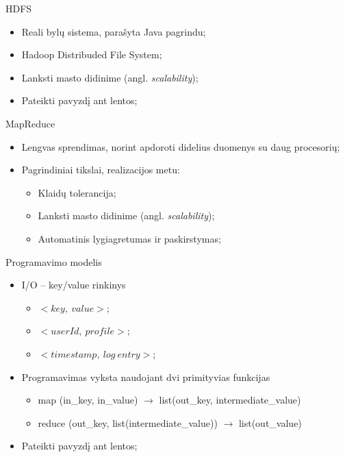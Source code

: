 \documentclass{beamer}
\begin{document}
  \begin{frame}{HDFS}
    \begin{itemize}
      \item Reali bylų sistema, parašyta Java pagrindu;
      \item Hadoop Distribuded File System;
      \item Lanksti masto didinime (angl. \textit{scalability});
      \item Pateikti pavyzdį ant lentos;
    \end{itemize}
  \end{frame}

  \begin{frame}{MapReduce}
    \begin{itemize}
      \item Lengvas sprendimas, norint apdoroti didelius duomenys su daug procesorių;
      \item Pagrindiniai tikslai, realizacijos metu:
      \begin{itemize}
        \item Klaidų tolerancija;
        \item Lanksti masto didinime (angl. \textit{scalability});
        \item Automatinis lygiagretumas ir paskirstymas;
      \end{itemize}
    \end{itemize}
  \end{frame}

  \begin{frame}{Programavimo modelis}
    \begin{itemize}
      \item I/O -- key/value rinkinys
      \begin{itemize}
        \item $<key,~value>$;
        \item $<userId,~profile>$;
        \item $<timestamp,~log~entry>$;
      \end{itemize}
      \item Programavimas vyksta naudojant dvi primityvias funkcijas
      \begin{itemize}
        \item map (in\_key, in\_value) $\rightarrow$ list(out\_key, intermediate\_value)
        \item reduce (out\_key, list(intermediate\_value)) $\rightarrow$ list(out\_value)
      \end{itemize}
      \item Pateikti pavyzdį ant lentos;
    \end{itemize}
  \end{frame}
\end{document}
